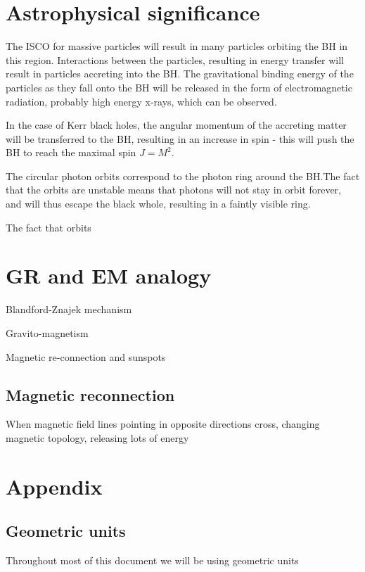 \documentclass{article}
\begin{document}
\section{Astrophysical significance}\label{sec:Astrophysical significance}

The ISCO for massive particles will result in many particles orbiting the BH in this region. Interactions between the particles, resulting in energy transfer will result in particles accreting into the BH. The gravitational binding energy of the particles as they fall onto the BH will be released in the form of electromagnetic radiation, probably high energy x-rays, which can be observed.

In the case of Kerr black holes, the angular momentum of the accreting matter will be transferred to the BH, resulting in an increase in spin - this will push the BH to reach the maximal spin $J=M^2$.

The circular photon orbits correspond to the photon ring around the BH.The fact that the orbits are unstable means that photons will not stay in orbit forever, and will thus escape the black whole, resulting in a faintly visible ring.

The fact that orbits 


\section{GR and EM analogy}

Blandford-Znajek mechanism

Gravito-magnetism

Magnetic re-connection and sunspots

\subsection{Magnetic reconnection}

When magnetic field lines pointing in opposite directions cross, changing magnetic topology, releasing lots of energy 

\section{Appendix}

\subsection{Geometric units}

Throughout most of this document we will be using geometric units
\end{document}

